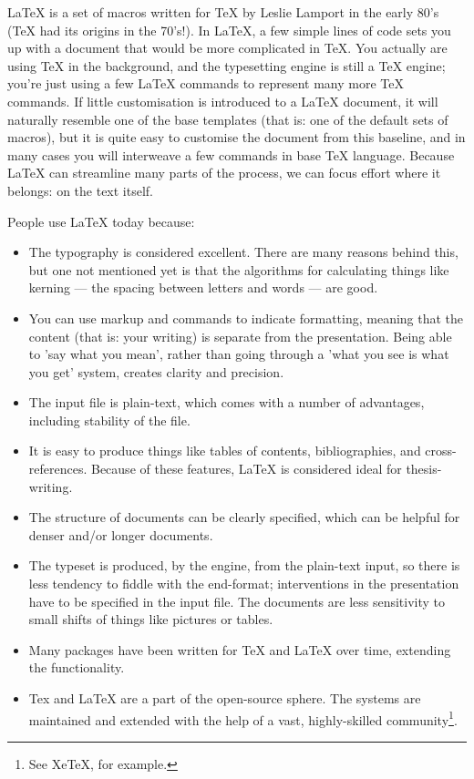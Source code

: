 \documentclass[11pt, oneside]{memoir}
\begin{document}
LaTeX is a set of macros written for TeX by Leslie Lamport in the early 80's (TeX had its origins in the 70's!). In LaTeX, a few simple lines of code sets you up with a document that would be more complicated in TeX. You actually are using TeX in the background, and the typesetting engine is still a TeX engine; you're just using a few LaTeX commands to represent many more TeX commands. If little customisation is introduced to a LaTeX document, it will naturally resemble one of the base templates (that is: one of the default sets of macros), but it is quite easy to customise the document from this baseline, and in many cases you will interweave a few commands in base TeX language. Because LaTeX can streamline many parts of the process, we can focus effort where it belongs: on the text itself.

People use LaTeX today because:
\begin{itemize}
    \item The typography is considered excellent. There are many reasons behind this, but one not mentioned yet is that the algorithms for calculating things like kerning — the spacing between letters and words — are good.
    \item You can use markup and commands to indicate formatting, meaning that the content (that is: your writing) is separate from the presentation. Being able to 'say what you mean', rather than going through a 'what you see is what you get' system, creates clarity and precision.
    \item The input file is plain-text, which comes with a number of advantages, including stability of the file. 
    \item It is easy to produce things like tables of contents, bibliographies, and cross-references. Because of these features, LaTeX is considered ideal for thesis-writing.
    \item The structure of documents can be clearly specified, which can be helpful for denser and/or longer documents.
    \item The typeset is produced, by the engine, from the plain-text input, so there is less tendency to fiddle with the end-format; interventions in the presentation have to be specified in the input file. The documents are less sensitivity to small shifts of things like pictures or tables.
    \item Many packages have been written for TeX and LaTeX over time, extending the functionality.
    \item Tex and LaTeX are a part of the open-source sphere. The systems are maintained and extended with the help of a vast, highly-skilled community\footnote{See XeTeX, for example.}.
\end{itemize}
\end{document}
